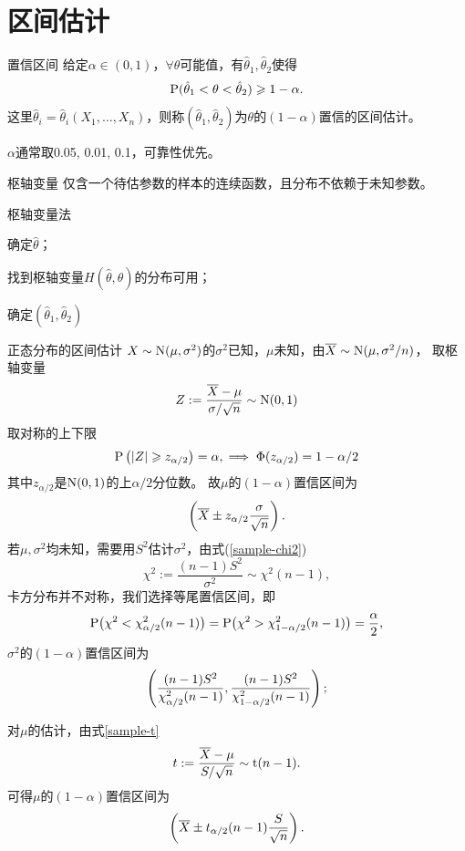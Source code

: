 \section{区间估计}
\begin{definition}{置信区间}{}
	给定$\alpha\in(0,1)$，$\forall\theta$可能值，有$\hat\theta_1,\hat\theta_2$使得
	\begin{align}
		\P(\hat\theta_1<\theta<\hat\theta_2)\geqslant1-\alpha.
	\end{align}
	这里$\hat\theta_i=\hat\theta_i(X_1,\ldots,X_n)$，则称$(\hat\theta_1,\hat\theta_2)$为$\theta$的$(1-\alpha)$置信的区间估计。
\end{definition}
$\alpha$通常取0.05, 0.01, 0.1，可靠性优先。
\begin{definition}{枢轴变量}{}
	仅含一个待估参数的样本的连续函数，且分布不依赖于未知参数。
\end{definition}
\begin{method}{枢轴变量法}{}
	\begin{compactenum}
		\item 确定$\hat\theta$；
		\item 找到枢轴变量$H(\hat\theta,\theta)$的分布可用；
		\item 确定$(\hat\theta_1,\hat\theta_2)$
	\end{compactenum}
\end{method}
\begin{example}{正态分布的区间估计}{}
	$X\sim\Norm(\mu,\sigma^2)$的$\sigma^2$已知，$\mu$未知，由$\avg X\sim\Norm(\mu,\sigma^2/n)$，
	取枢轴变量
	\[
		Z:=\frac{\avg X-\mu}{\sigma/\sqrt n}\sim\Norm(0,1)
	\]
	取对称的上下限
	\[
		\P\kh{\abs Z\geqslant z_{\alpha/2}}=\alpha,\implies\Phi(z_{\alpha/2})=1-\alpha/2
	\]
	其中$z_{\alpha/2}$是$\Norm(0,1)$的上$\alpha/2$分位数。
	故$\mu$的$(1-\alpha)$置信区间为
	\begin{align}
		\kh{\avg X\pm z_{\alpha/2}\frac\sigma{\sqrt n}}.
	\end{align}
	\tcblower
	若$\mu,\sigma^2$均未知，需要用$S^2$估计$\sigma^2$，由式(\ref{sample-chi2})
	\[
		\chi^2:=\frac{(n-1)S^2}{\sigma^2}\sim\chi^2(n-1),
	\]
	卡方分布并不对称，我们选择等尾置信区间，即
	\[
		\P\bigkh{\chi^2<\chi_{\alpha/2}^2(n-1)}=\P\bigkh{\chi^2>\chi_{1-\alpha/2}^2(n-1)}=\frac\alpha{2},
	\]
	$\sigma^2$的$(1-\alpha)$置信区间为
	\begin{align}
		\kh{\frac{(n-1)S^2}{\chi_{\alpha/2}^2(n-1)},\frac{(n-1)S^2}{\chi_{1-\alpha/2}^2(n-1)}};
	\end{align}

	对$\mu$的估计，由式\eqref{sample-t}
	\[
		t:=\frac{\avg X-\mu}{S/\sqrt n}\sim\mathrm t(n-1).
	\]
	可得$\mu$的$(1-\alpha)$置信区间为
	\begin{align}
		\kh{\avg X\pm t_{\alpha/2}(n-1)\frac{S}{\sqrt n}}.
	\end{align}
\end{example}
